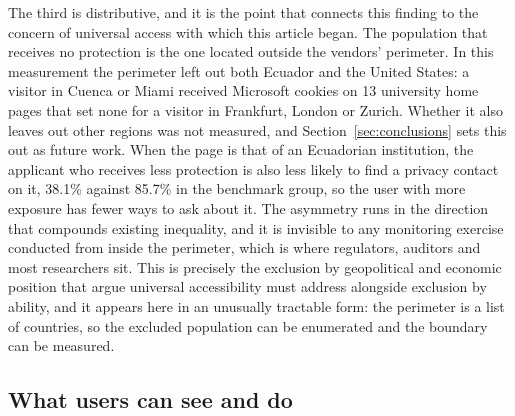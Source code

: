 \documentclass[]{interact}
\begin{document}
The third is distributive, and it is the point that connects this finding to the concern of universal access with which this article began. The population that receives no protection is the one located outside the vendors' perimeter. In this measurement the perimeter left out both Ecuador and the United States: a visitor in Cuenca or Miami received Microsoft cookies on 13 university home pages that set none for a visitor in Frankfurt, London or Zurich. Whether it also leaves out other regions was not measured, and Section~\ref{sec:conclusions} sets this out as future work. When the page is that of an Ecuadorian institution, the applicant who receives less protection is also less likely to find a privacy contact on it, 38.1\% against 85.7\% in the benchmark group, so the user with more exposure has fewer ways to ask about it. The asymmetry runs in the direction that compounds existing inequality, and it is invisible to any monitoring exercise conducted from inside the perimeter, which is where regulators, auditors and most researchers sit. This is precisely the exclusion by geopolitical and economic position that \citet{abascal2016rethinking} argue universal accessibility must address alongside exclusion by ability, and it appears here in an unusually tractable form: the perimeter is a list of countries, so the excluded population can be enumerated and the boundary can be measured.

\subsection{What users can see and do}\label{sec:discussion-users}
\end{document}
